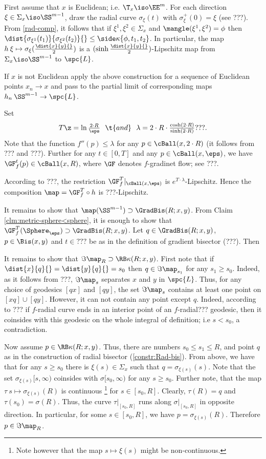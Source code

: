 First assume that $x$ is Euclidean;
i.e. $\T_x\iso\EE^m$.
For each direction $\xi\in\Sigma_x\iso\SS^{m-1}$, 
draw the radial curve $\sigma_\xi(t)$ with $\sigma^+_\xi(0)=\xi$ (see ???).
From \ref{rad-comp}, 
it follows that if $\xi^1,\xi^2\in\Sigma_x$ and $\mangle(\xi^1,\xi^2)=\phi$ then $\dist{\sigma_{\xi^1}(t_1)}{\sigma_{\xi^2}(t_2)}{}\le \side\kappa \{\phi,t_1,t_2\}$.
In particular, the map $h\:\xi\mapsto\sigma_\xi(\tfrac{\dist{x}{y}{}}{2})$ is a $(\sinh\tfrac{\dist{x}{y}{}}{2})$-Lipschitz map from $\Sigma_x\iso\SS^{m-1}$ to $\spc{L}$.

If $x$ is not  Euclidean apply the above construction for a sequence of Euclidean points $x_n\to x$ 
and pass to the partial limit of corresponding maps $h_n\:\SS^{m-1}\to\spc{L}$.
\qeds

Set 
$$T\z=\ln\tfrac{2\cdot R}\eps\ \ \t{and}\ \ \lambda=2\cdot R\cdot \tfrac{\cosh(2\cdot R)}{\sinh(2\cdot R)}???.$$
Note that the function 
$f''(p)
\le 
\lambda$
 for any  $p\in\cBall(x,2\cdot R)$ (it follows from ??? and ???).
Further for any $t\in[0,T]$ and any $p\in\cBall(x,\eps)$,
we have $\GF^t_f(p)\in\cBall(x,R)$, where $\GF$ denotes $f$-gradinet flow; see ???.

According to ???, the restriction $\GF^T_f|_{\cBall(x,\eps)}$ is $e^{T\cdot \lambda}$-Lipschitz.
Hence the composition $\map=\GF^T_f\circ h$ is ???-Lipschitz.


It remains to show that $\map(\SS^{m-1})\supset \GradBis(R;x,y)$.
From Claim \ref{clm:metric-sphere<sphere}, it is enough to show that $\GF^T_f(\Sphere_\eps)\supset\GradBis(R;x,y)$.
Let $q\in\GradBis(R;x,y)$, $p\in\Bis(x,y)$ and $t\in???$ be as in the definition of gradient bisector (???).
Then




It remains to show that $\Im\map_R\supset \RB\kappa(R;x,y)$.
First note that
if $\dist{x}{q}{}=\dist{y}{q}{}=s_0$ then $q\in\Im\map_{s_1}$ for any $s_1\ge s_0$.
Indeed, as it follows from ???, $\Im\map_s$ separates $x$ and $y$ in $\spc{L}$.
Thus, for any choice of geodesics $[q x]$ and $[q y]$, 
the set $\Im\map_s$ contains at least one point on $[x q]\cup[q y]$.
However, it can not contain any point except $q$.
Indeed, according to ??? if $f$-radial curve ends in an interior point of an $f$-radial??? geodesic, 
then it coinsides with this geodesic on the whole integral of definition; i.e $s<s_0$, a contradiction.

Now assume $p\in \RB\kappa(R;x,y)$.
Thus,
there are numbers $s_0\le s_1\le R$, and point $q$ as in the construction of radial bisector (\ref{constr:Rad-bis}).
From above, we have that for any $s\ge s_0$ there is $\xi(s)\in\Sigma_x$ such that $q=\sigma_{\xi(s)}(s)$.
Note that the set $\sigma_{\xi(s)}[s,\infty)$ coinsides with $\sigma[s_0,\infty)$ 
for any $s\ge s_0$.
Further note, that the map $\tau\:s\mapsto \sigma_{\xi(s)}(R)$ is continuous%
\footnote{Note however that the map $s\mapsto\xi(s)$ might be non-continuous.}
for $s\in[s_0,R]$.
Clearly, $\tau(R)=q$ and $\tau(s_0)=\sigma(R)$.
Thus, the curve $\tau|_{[s_0,R]}$ runs along $\sigma|_{[s_0,R]}$ in opposite direction.
In particular, for some $s\in[s_0,R]$, we have
$p=\sigma_{\xi(s)}(R)$.
Therefore $p\in\Im\map_R$.

